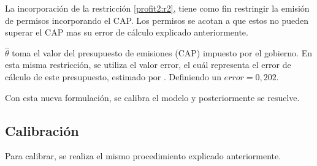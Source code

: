 La incorporación de la restricción \ref{profit2:r2}, tiene como fin restringir la emisión de permisos incorporando el CAP. Los permisos se acotan a que estos no pueden superar el CAP mas su error de cálculo explicado anteriormente.
\vspace{2.5mm}

$\hat{\theta}$ toma el valor del presupuesto de emisiones (CAP) impuesto por el gobierno. En esta misma restricción, se utiliza el valor error, el cuál representa el error de cálculo de este presupuesto, estimado por \cite{andres_new_2014}. Definiendo un $error=0,202$. 
\vspace{2.5mm}

Con esta nueva formulación, se calibra el modelo y posteriormente se resuelve.

\subsection{Calibración}

Para calibrar, se realiza el mismo procedimiento explicado anteriormente. 

